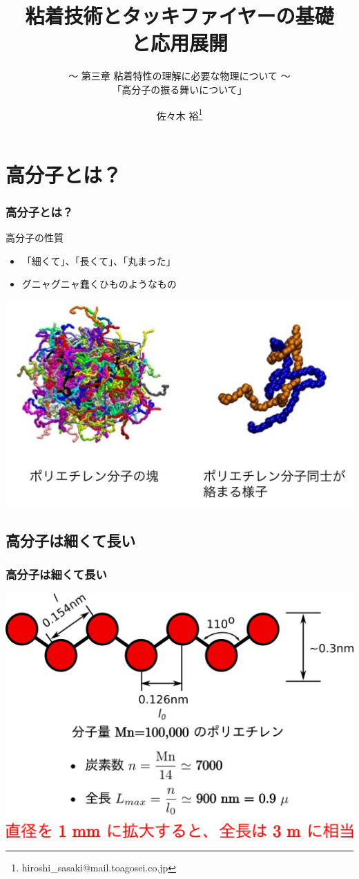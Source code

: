 \documentclass[12pt, dvipdfmx]{beamer}
\title{粘着技術とタッキファイヤーの基礎\\と応用展開}
\subtitle{ ～ 第三章 粘着特性の理解に必要な物理について ～\\「高分子の振る舞いについて」}
\author[東亞合成 佐々木]{佐々木 裕\thanks{hiroshi\_sasaki@mail.toagosei.co.jp}}
\institute[東亞合成]{東亞合成株式会社}
\date{}
\begin{document}
\maketitle

\begin{frame} 
    \tableofcontents[]
\end{frame} 

\section{高分子とは？}
\begin{frame}
	\frametitle{高分子とは？}
		\begin{block}{高分子の性質}
			\begin{itemize}
				\item 「細くて」、「⻑くて」、「丸まった」
				\item グニャグニャ蠢くひものようなもの
			\end{itemize}
		\end{block}
		\centering
		\includegraphics[width=.8\textwidth]{polymer_image.jpg}
\end{frame}

\subsection{高分子は細くて長い}
\begin{frame}
	\frametitle{高分子は細くて長い}
	\centering
	\includegraphics[width=.8\textwidth]{polymer_model.png}
\end{frame}
\end{document}
